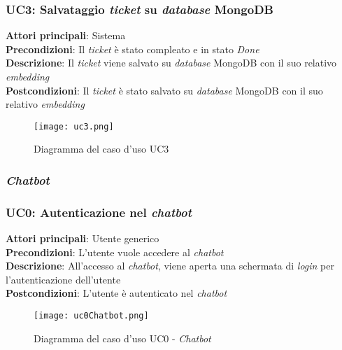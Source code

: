 \subsubsection{UC3: Salvataggio \textit{ticket} su \textit{database} MongoDB}
\textbf{Attori principali}: Sistema \\
\textbf{Precondizioni}: Il \textit{ticket} è stato compleato e in stato \textit{Done} \\
\textbf{Descrizione}: Il \textit{ticket} viene salvato su \textit{database} MongoDB con il suo relativo \textit{embedding} \\
\textbf{Postcondizioni}: Il \textit{ticket} è stato salvato su \textit{database} MongoDB con il suo relativo \textit{embedding} \\
\begin{figure}[H]
    \centering
    \texttt{[image: uc3.png]}
    \caption{Diagramma del caso d'uso UC3}
    \label{fig:UC5}
\end{figure}

\subsubsection{\textit{Chatbot}}

\subsubsection{UC0: Autenticazione nel \textit{chatbot}}
\textbf{Attori principali}: Utente generico \\
\textbf{Precondizioni}: L'utente vuole accedere al \textit{chatbot} \\
\textbf{Descrizione}: All'accesso al \textit{chatbot}, viene aperta una schermata di \textit{login} per l'autenticazione dell'utente \\
\textbf{Postcondizioni}: L'utente è autenticato nel \textit{chatbot} \\
\begin{figure}[H]
    \centering
    \texttt{[image: uc0Chatbot.png]}
    \caption{Diagramma del caso d'uso UC0 - \textit{Chatbot}}
    \label{fig:UC0Chatbot}
\end{figure}

